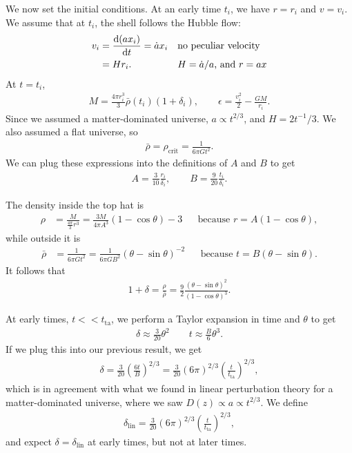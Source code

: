 We now set the initial conditions.
At an early time $t_i$, we have $r=r_i$ and $v = v_i$. We assume that at $t_i$, the shell follows the Hubble flow:
\begin{align*}
	v_i
	&= \dv{(a x_i)}{t} 
	= \dot{a} x_i &&\text{no peculiar velocity}\\
	&= H r_i.
	&& H = \dot{a}/a \text{, and } r = a x
\end{align*}
At $t=t_i$,
\begin{align*}
	M
	= \frac{4\pi r_i^3}{3}  \bar{\rho}(t_i)(1+\delta_i),
	\qquad
	\epsilon
	= \frac{v_i^2}{2}  - \frac{GM}{r_i}.
\end{align*}
Since we assumed a matter-dominated universe, $a \propto t^{2/3}$, and $H = 2 t^{-1} / 3$. We also assumed a flat universe, so
\begin{align*}
	\bar{\rho}
	= \rho_\text{crit}
	= \frac{1}{6\pi G t^2}.
\end{align*}
We can plug these expressions into the definitions of $A$ and $B$ to get
\begin{align*}
	A = \frac{3}{10} \frac{r_i}{\delta_i},
	\qquad
	B = \frac{9}{20} \frac{t_i}{\delta_i}.
\end{align*}

The density inside the top hat is
\begin{align*}
	\rho
	&= \frac{M}{\frac{4\pi}{3}r^3}
	= \frac{3M}{4\pi A^3} (1-\cos\theta)-3
	&&\text{because } r = A(1-\cos\theta),
\end{align*}
while outside it is
\begin{align*}
	\bar{\rho}
	&= \frac{1}{6\pi G t^2}
	= \frac{1}{6 \pi G B^2} (\theta-\sin\theta)^{-2}
	&& \text{because } t = B(\theta - \sin\theta).
\end{align*}
It follows that
\begin{align*}
	1 + \delta
	= \frac{\rho}{\bar{\rho}}
	= \frac{9}{2} \frac{(\theta-\sin\theta)^{2}}{(1-\cos\theta)^3}.
\end{align*}

At early times, $t << t_\text{ta}$, we perform a Taylor expansion in time and $\theta$ to get
\begin{align*}
	\delta \approx \frac{3}{20} \theta^2
	\qquad
	t \approx \frac{B}{6} \theta^3.
\end{align*}
If we plug this into our previous result, we get
\begin{align*}
	\delta
	= \frac{3}{20} \left( \frac{6 t}{B} \right)^{2/3}
	= \frac{3}{20} (6\pi)^{2/3} \left( \frac{t}{t_\text{ta}} \right)^{2/3},
\end{align*}
which is in agreement with what we found in linear perturbation theory for a matter-dominated universe, where we saw $D(z) \propto a \propto t^{2/3}$.
We define
\begin{align*}
	\delta_\text{lin} = \frac{3}{20} (6\pi)^{2/3} \left( \frac{t}{t_\text{ta}} \right)^{2/3},
\end{align*}
and expect $\delta = \delta_\text{lin}$ at early times, but not at later times.

